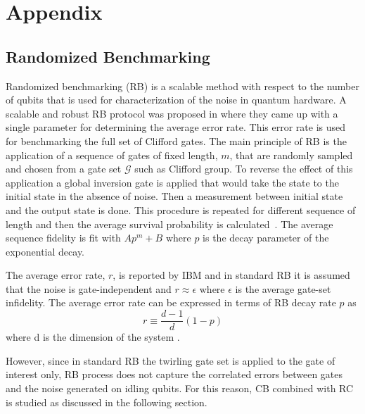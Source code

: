 \section{Appendix}
\label{sec:appendix}
\begin{appendix}
\section{Randomized  Benchmarking}
\label{sec:rand_bench}
Randomized benchmarking (RB) is a scalable method with respect to the number of qubits that is used for characterization of the noise in quantum hardware. A scalable and robust RB protocol was proposed in \cite{Magesan2010}
where they came up with a single parameter for determining the average error rate. This error rate is used for benchmarking the full set of Clifford gates.  
The main principle of RB is the application of a sequence of gates of fixed length, $m$, that are randomly sampled and chosen from a gate set $\mathcal{G}$ such as Clifford group. To reverse the effect of this application a global inversion gate is applied that would take the state to the initial state in the absence of noise. Then a measurement between initial state and the output state is done. This procedure is repeated for different sequence of length and then the average survival probability is calculated~\cite{Helsen2019}. The average sequence fidelity is fit with $A p^m+B$ where $p$ is the decay parameter of the exponential decay. 

The average error rate, $r$, is reported by IBM and in standard RB it is assumed that the noise is gate-independent and $r\approx \epsilon$ where $\epsilon$ is the average gate-set infidelity. The average error rate  can be expressed in terms of RB decay rate $p$ as
\begin{equation}
    r\equiv \frac{d-1}{d}(1-p) 
    \label{eq:err_rate}
\end{equation}
where d is the dimension of the system
\cite{Qi2019}. 


However, since in standard RB the twirling gate set is applied to the gate of interest only, RB process does not capture the correlated errors between gates and the noise generated on idling qubits. For this reason, CB combined with RC is studied as discussed in the following section. 


\end{appendix}
